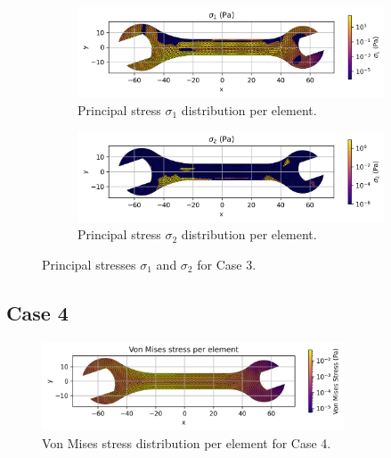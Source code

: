 \begin{figure}[H]
    \centering
    \begin{subfigure}[t]{0.49\textwidth}
        \centering
        \includegraphics[width=\textwidth]{GRAFICOS/Case c - sigma_1_per_element.png}
        \caption{Principal stress $\sigma_1$ distribution per element.}
        \label{fig:sigma_1_c}
    \end{subfigure}
    \hfill
    \begin{subfigure}[t]{0.49\textwidth}
        \centering
        \includegraphics[width=\textwidth]{GRAFICOS/Case c - sigma_2_per_element.png}
        \caption{Principal stress $\sigma_2$ distribution per element.}
        \label{fig:sigma_2_c}
    \end{subfigure}
    \caption{Principal stresses $\sigma_1$ and $\sigma_2$ for Case 3.}
    \label{fig:principal_stresses_c}
\end{figure}

\subsection{Case 4}

\begin{figure}[H]
    \centering
    \includegraphics[width=0.8\textwidth]{GRAFICOS/Case d_von_mises_per_element.png}
    \caption{Von Mises stress distribution per element for Case 4.}
    \label{fig:von_mises_d}
\end{figure}

